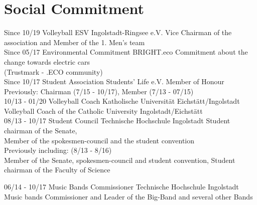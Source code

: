 \documentclass[]{friggeri-cv}
\begin{document}
\section{Social Commitment}
\begin{entrylist}
     \entry
    {Since 10/19}
    {Volleyball}
    {ESV Ingolstadt-Ringsee e.V.}
    {Vice Chairman of the association and Member of the 1. Men's team\\}
     \entry
    {Since 05/17}
    {Environmental Commitment}
    {BRIGHT.eco}
    {Commitment about the change towards electric cars \\(Trustmark - .ECO community)\\}
     \entry
    {Since 10/17}
    {Student Association}
    {Students' Life e.V.}
    {Member of Honour \\
    Previously: Chairman (7/15 - 10/17), Member (7/13 - 07/15)\\}
    \entry
    {10/13 - 01/20}
    {Volleyball Coach}
    {Katholische Universität Eichstätt/Ingolstadt}
    {Volleyball Coach of the Catholic University Ingolstadt/Eichstätt\\}
    \entry
    {08/13 - 10/17}
    {Student Council}
    {Technische Hochschule Ingolstadt}
    {Student chairman of the Senate,\\ Member of the spokesmen-council and the student convention\\ 
    Previously including: (8/13 - 8/16) \\Member of the Senate, spokesmen-council and student convention, Student chairman of the Faculty of Science}
    
    \entry
    {06/14 - 10/17}
    {Music Bands Commissioner}
    {Technische Hochschule Ingolstadt}
    {Music bands Commissioner and Leader of the Big-Band and several other Bands\\}
\end{entrylist}
\end{document}
